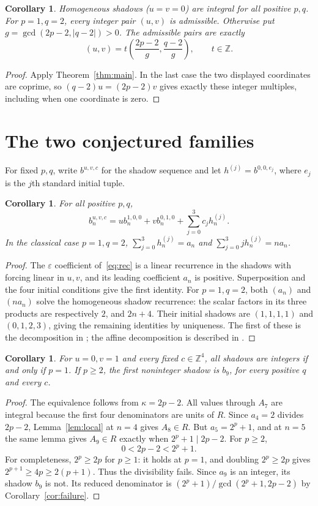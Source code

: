 \documentclass[11pt]{article}
\newtheorem{corollary}[theorem]{Corollary}
\newcommand{\ZZ}{\mathbb Z}
\newcommand{\eps}{\varepsilon}
\begin{document}
\begin{corollary}\label{cor:weights}
Homogeneous shadows ($u=v=0$) are integral for all positive $p,q$.
For $p=1,q=2$, every integer pair $(u,v)$ is admissible. Otherwise put
$g=\gcd(2p-2,|q-2|)>0$. The admissible pairs are exactly
\[
 (u,v)=t\left(\frac{2p-2}{g},\frac{q-2}{g}\right),\qquad t\in\ZZ.
\]
\end{corollary}
\begin{proof}
Apply Theorem~\ref{thm:main}. In the last case the two displayed
coordinates are coprime, so $(q-2)u=(2p-2)v$ gives exactly these
integer multiples, including when one coordinate is zero.
\end{proof}

\section{The two conjectured families}
For fixed $p,q$, write $b^{u,v,c}$ for the shadow sequence and let
$h^{(j)}=b^{0,0,e_j}$, where $e_j$ is the $j$th standard initial tuple.
\begin{corollary}\label{cor:affine}
For all positive $p,q$,
\[
 b^{u,v,c}_n=u b^{1,0,0}_n+v b^{0,1,0}_n
              +\sum_{j=0}^3 c_jh^{(j)}_n.
\]
In the classical case $p=1,q=2$,
$\sum_{j=0}^3 h^{(j)}_n=a_n$ and
$\sum_{j=0}^3 jh^{(j)}_n=na_n$.
\end{corollary}
\begin{proof}
The $\eps$ coefficient of~\eqref{eq:rec} is a linear recurrence in
the shadows with forcing linear in $u,v$, and its leading coefficient
$a_n$ is positive. Superposition and the four initial conditions give
the first identity. For $p=1,q=2$, both $(a_n)$ and $(na_n)$ solve
the homogeneous shadow recurrence: the scalar factors in its three
products are respectively $2$, and $2n+4$. Their initial shadows
are $(1,1,1,1)$ and $(0,1,2,3)$, giving the remaining identities by
uniqueness. The first of these is the decomposition in
\cite[Section~2.1]{OT}; the affine decomposition is described in
\cite[Section~2.2]{OT}.
\end{proof}

\begin{corollary}\label{cor:first}
For $u=0,v=1$ and every fixed $c\in\ZZ^4$, all shadows are integers
if and only if $p=1$. If $p\ge2$, the first noninteger shadow is
$b_9$, for every positive $q$ and every $c$.
\end{corollary}
\begin{proof}
The equivalence follows from $\kappa=2p-2$.
All values through $A_7$ are integral because the first four
denominators are units of $R$. Since $a_4=2$ divides $2p-2$,
Lemma~\ref{lem:local} at $n=4$ gives $A_8\in R$.
But $a_5=2^p+1$, and at $n=5$ the same lemma gives
$A_9\in R$ exactly when $2^p+1\mid2p-2$. For $p\ge2$,
\[
 0<2p-2<2^p+1.
\]
For completeness, $2^p\ge2p$ for $p\ge1$: it holds at $p=1$,
and doubling $2^p\ge2p$ gives $2^{p+1}\ge4p\ge2(p+1)$.
Thus the divisibility fails. Since $a_9$ is an integer, its shadow
$b_9$ is not.
Its reduced denominator is
$(2^p+1)/\gcd(2^p+1,2p-2)$ by Corollary~\ref{cor:failure}.
\end{proof}
\end{document}
